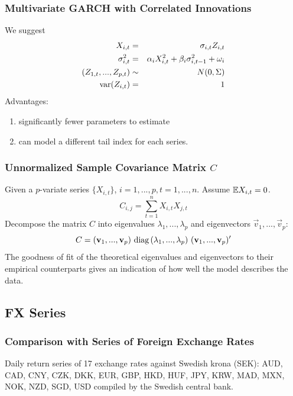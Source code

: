 \documentclass{beamer}
\begin{document}
\begin{frame}
  \frametitle{Multivariate GARCH with Correlated Innovations}
  We suggest
  \begin{eqnarray*}
    X_{i, t} &=& \sigma_{i, t} Z_{i, t} \\
    \sigma_{i, t}^2 &=& \alpha_{i} X_{i, t}^2 + \beta_{i} \sigma_{i, t-1}^2 + \omega_i \\
    (Z_{1, t}, ..., Z_{p, t}) &\sim& N(0, \Sigma) \\
    \text{var}(Z_{i,t}) &=& 1
  \end{eqnarray*}
  Advantages:
  \begin{enumerate}
  \item significantly fewer parameters to estimate
  \item can model a different tail index for each series.
  \end{enumerate}
\end{frame}

\begin{frame}
  \frametitle{Unnormalized Sample Covariance Matrix $C$}
  Given a $p$-variate series $\{X_{i, t}\}$, $i=1,...,p, t=1,...,n$.
  Assume $\mathbb{E} X_{i, t} = 0$.
  \[
  C_{i, j} = \sum_{t=1}^n X_{i,t} X_{j,t}
  \]
  Decompose the matrix $C$ into eigenvalues $\lambda_1, ...,
  \lambda_p$ and eigenvectors $\vec v_1, ..., \vec v_p$:
  \[
  C = (\vec v_1, ..., \vec v_p) \ 
  \diag(\lambda_1, ..., \lambda_p) \  
  (\vec v_1, ..., \vec v_p)'
  \]
  The goodness of fit of the theoretical eigenvalues and eigenvectors
  to their empirical counterparts gives an indication of how well the
  model describes the data.
\end{frame}

\subsection{FX Series}
\begin{frame}
  \frametitle{Comparison with Series of Foreign Exchange Rates}
  Daily return series of 17 exchange rates against Swedish krona (SEK):
  AUD,
  CAD,
  CNY,
  CZK,
  DKK,
  EUR,
  GBP,
  HKD,
  HUF,
  JPY,
  KRW,
  MAD,
  MXN,
  NOK,
  NZD,
  SGD,
  USD
  compiled by the Swedish central bank.
\end{frame}
\end{document}

